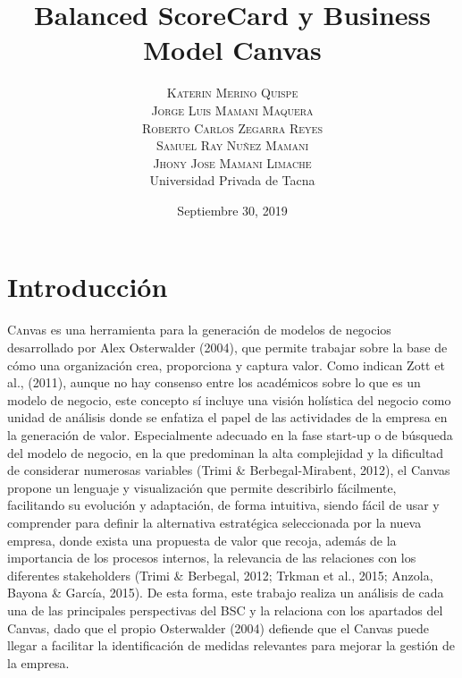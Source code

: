 \documentclass[twoside,twocolumn]{article}
\title{Balanced ScoreCard y Business Model Canvas} %
\author{%
\textsc{Katerin Merino Quispe} \\[1ex] %
\textsc{Jorge Luis Mamani Maquera} \\[1.01ex] %
\textsc{Roberto Carlos Zegarra Reyes} \\[1.02ex] %
\textsc{Samuel Ray Nuñez Mamani} \\[1.03ex] %
\textsc{Jhony Jose Mamani Limache} \\[1.04ex] %
\normalsize Universidad Privada de Tacna \\  %
\normalsize {} %
}
\date{Septiembre 30, 2019} %
\begin{document}
\maketitle


\section{Introducción}

\lettrine[nindent=0em,lines=2]{C}anvas es una herramienta para la generación de modelos de negocios desarrollado por Alex Osterwalder (2004), que permite trabajar sobre la base de cómo una organización crea, proporciona y captura valor. Como indican Zott et al., (2011), aunque no hay consenso entre los académicos sobre lo que es un modelo de negocio, este concepto sí incluye una visión holística del negocio como unidad de análisis donde se enfatiza el papel de las actividades de la empresa en la generación de valor. Especialmente adecuado en la fase start-up o de búsqueda del modelo de negocio, en la que predominan la alta complejidad y la dificultad de considerar numerosas variables (Trimi \& Berbegal-Mirabent, 2012), el Canvas propone un lenguaje y visualización que permite describirlo fácilmente, facilitando su evolución y adaptación, de forma intuitiva, siendo fácil de usar y comprender para definir la alternativa estratégica seleccionada por la nueva empresa, donde exista una propuesta de valor que recoja, además de la importancia de los procesos internos, la relevancia de las relaciones con los diferentes stakeholders (Trimi \& Berbegal, 2012; Trkman et al., 2015; Anzola, Bayona \& García, 2015). De esta forma, este trabajo realiza un análisis de cada una de las principales perspectivas del BSC y la relaciona con los apartados del Canvas, dado que el propio Osterwalder (2004) defiende que el Canvas puede llegar a facilitar la identificación de medidas relevantes para mejorar la gestión de la empresa.
\end{document}
